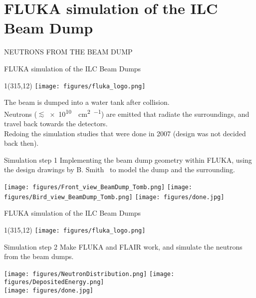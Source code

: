 \documentclass[xcolor={dvipsnames}]{beamer}
\newcommand{\flukalogo}{
  \setlength{\TPHorizModule}{1pt}
  \setlength{\TPVertModule}{1pt}
  \begin{textblock}{1}(315,12)
   \texttt{[image: figures/fluka\_logo.png]}
  \end{textblock}
}
\begin{document}
\section{FLUKA simulation of the ILC Beam Dump}
\begin{frame}
 \begin{center}
  \alert{\MakeUppercase{Neutrons from the beam dump}}
 \end{center}
\end{frame}
{
\begin{frame}{FLUKA simulation of the ILC Beam Dumps}
\flukalogo
The beam is dumped into a water tank after collision.\\Neutrons ($\lesssim$\SI{e10}{\per\square\centi\metre\per\year}) are emitted that radiate the surroundings, and travel back towards the detectors.\\
\vspace*{0.1cm}
Redoing the simulation studies that were done in 2007 (design was not decided back then).
\begin{block}{Simulation step 1}
Implementing the beam dump geometry within FLUKA, using the design drawings by B. Smith~\cite{Smith} to model the dump and the surrounding.
\end{block}

\begin{center}
\texttt{[image: figures/Front\_view\_BeamDump\_Tomb.png]}
\hspace*{0.2cm}
\texttt{[image: figures/Bird\_view\_BeamDump\_Tomb.png]}
\texttt{[image: figures/done.jpg]}
\end{center}
\end{frame}

\begin{frame}{FLUKA simulation of the ILC Beam Dumps}
\flukalogo
\begin{block}{Simulation step 2}
Make FLUKA and FLAIR work, and simulate the neutrons from the beam dumps.
\end{block}

\begin{center}
\texttt{[image: figures/NeutronDistribution.png]}
\texttt{[image: figures/DepositedEnergy.png]}\\
\texttt{[image: figures/done.jpg]}
\end{center}
\end{frame}

}
\end{document}
